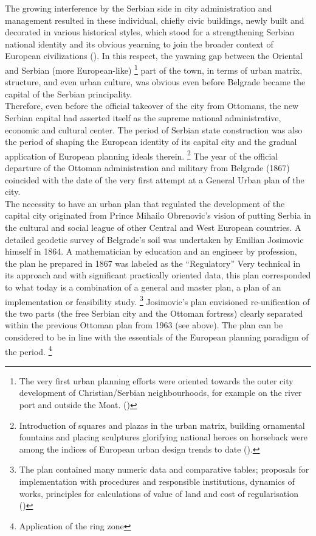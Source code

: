 \documentclass[11pt]{report}
\begin{document}
{{{{The growing interference by the Serbian side in city administration and management resulted in these individual, chiefly civic buildings, newly built and decorated in various historical styles, which stood for a strengthening Serbian national identity and its obvious yearning to join the broader context of European civilizations (\href{Hirt}{\citealt{hirt_belgrade_2009}}).
In this respect, the yawning gap between the Oriental and Serbian (more European-like)
\footnote{The very first urban planning efforts were oriented towards the outer city development of Christian/Serbian neighbourhoods, for example on the river port and outside the Moat. (\href{Blagojevic}{\citealt{blagojevic_urban_2009}})}
part of the town, in terms of urban matrix, structure, and even urban culture, was obvious even before Belgrade became the capital of the Serbian principality.
\\

Therefore, even before the official takeover of the city from Ottomans, the new Serbian capital had asserted itself as the supreme national administrative, economic and cultural center.  The period of Serbian state construction was also the period of shaping the European identity of its capital city and the gradual application of European planning ideals therein.
\footnote{Introduction of squares and plazas in the urban matrix, building ornamental fountains and placing sculptures glorifying national heroes on horseback were among the indices of European urban design trends to date (\href{Hirt}{\citealt{hirt_belgrade_2009}}).}
The year of the official departure of the Ottoman administration and military from Belgrade (1867) coincided with the date of the very first attempt at a General Urban plan of the city.
\\

The necessity to have an urban plan that regulated the development of the capital city originated from Prince Mihailo Obrenovic’s vision of putting Serbia in the cultural and social league of other Central and West European countries. A detailed geodetic survey of Belgrade’s soil was undertaken by Emilian Josimovic himself in 1864. A mathematician by education and an engineer by profession, the plan he prepared in 1867 was labeled as the “Regulatory” Very technical in its approach and with significant practically oriented data, this plan corresponded to what today is a combination of a general and master plan, a plan of an implementation or feasibility study.
\footnote{The plan contained many numeric data and comparative tables; proposals  for  implementation with procedures and responsible institutions, dynamics of works, principles for calculations of value of land and cost of regularisation (\href{Blagojevic}{\citealt{blagojevic_urban_2009}})}
Josimovic’s plan envisioned re-unification of the two parts (the free Serbian city and the Ottoman fortress) clearly separated within the previous Ottoman plan from 1963 (see above). The plan can be considered to be in line with the essentials of the European planning paradigm of the period.
\footnote{Application of the ring zone}
\\

}}}}
\end{document}
